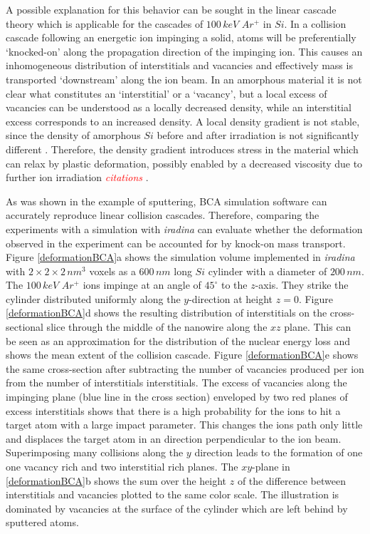 \documentclass[12pt,
paper=a4,				
DIV=calc,		  %
BCOR=16mm,	  %
headinclude,
openany
]{scrbook}
\newcommand{\TODO}[1]{{\LARGE{\textcolor{red}{\emph {#1 }}}}}
\begin{document}
A possible explanation for this behavior can be sought in the linear cascade theory which is applicable for the cascades of $100\,keV\,\,Ar^+$ in $Si$. In a collision cascade following an energetic ion impinging a solid, atoms will be preferentially `knocked-on' along the propagation direction of the impinging ion. This causes an inhomogeneous distribution of interstitials and vacancies and effectively mass is transported `downstream' along the ion beam. In an amorphous material it is not clear what constitutes an `interstitial' or a `vacancy', but a local excess of vacancies can be understood as a locally decreased density, while an interstitial excess corresponds to an increased density. A local density gradient is not stable, since the density of amorphous $Si$ before and after irradiation is not significantly different \cite{pelaz_ion-beam-induced_2004}. Therefore, the density gradient introduces stress in the material which can relax by plastic deformation, possibly enabled by a decreased viscosity due to further ion irradiation \TODO{citations}. 

As was shown in the example of sputtering, BCA simulation software can accurately reproduce linear collision cascades. Therefore, comparing the experiments with a simulation with \emph{iradina} can evaluate whether the deformation observed in the experiment can be accounted for by knock-on mass transport. Figure \ref{deformationBCA}a shows the simulation volume implemented in \emph{iradina} with $2\times2\times2\,nm^3$ voxels as a $600\,nm$ long $Si$ cylinder with a diameter of $200\,nm$. The $100\,keV\,\,Ar^+$ ions impinge at an angle of $45^\circ$ to the $z$-axis. They strike the cylinder distributed uniformly along the $y$-direction at height $z=0$. Figure \ref{deformationBCA}d shows the resulting distribution of interstitials on the cross-sectional slice through the middle of the nanowire along the $xz$ plane. This can be seen as an approximation for the distribution of the nuclear energy loss and shows the mean extent of the collision cascade. Figure \ref{deformationBCA}e shows the same cross-section after subtracting the number of vacancies produced per ion from the number of interstitials interstitials. The excess of vacancies along the impinging plane (blue line in the cross section) enveloped by two red planes of excess interstitials shows that there is a high probability for the ions to hit a target atom with a large impact parameter. This changes the ions path only little and displaces the target atom in an direction perpendicular to the ion beam. Superimposing many collisions along the $y$ direction leads to the formation of one one vacancy rich and two interstitial rich planes. The $xy$-plane in \ref{deformationBCA}b shows the sum over the height $z$ of the difference between interstitials and vacancies plotted to the same color scale. The illustration is dominated by vacancies at the surface of the cylinder which are left behind by sputtered atoms. 
\end{document}
